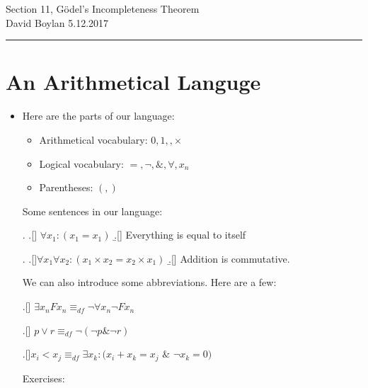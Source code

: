 \documentclass[justified]{tufte-handout}
\newcommand{\HRule}{\rule{\linewidth}{0.1mm}}
\begin{document}
\frenchspacing

\begin{fullwidth}
\noindent\LARGE Section 11, G\"{o}del's Incompleteness Theorem \normalsize \\[.3cm]
\noindent  David Boylan \hfill{5.12.2017}

\noindent\HRule
\end{fullwidth}

\section{An Arithmetical Languge}

\begin{itemize}

\item Here are the parts of our language:

\begin{itemize}
\item Arithmetical vocabulary: $0,1, ,\times$

\item Logical vocabulary: $=, \neg, \&, \forall, x_n$

\item Parentheses: $(,)$

\end{itemize}

\vspace{.4cm} 

Some sentences in our language:

\ex.  \a.[] $\forall x_1: (x_1=x_1)$
\b.[] Everything is equal to itself

\ex. \a.[]$\forall x_1\forall x_2:  (x_1 \times x_2 = x_2 \times x_1)$
\b.[] Addition is commutative.

\vspace{.4cm} 


We can also introduce some abbreviations. Here are a few: 

\ex.[] $\exists x_n Fx_n \equiv_{df} \neg\forall x_n\neg Fx_n $ 

\ex.[] $ p \vee r \equiv_{df} \neg(\neg p \& \neg r)$

\ex.[]$x_i < x_j \equiv_{df} \exists x_k:(x_i + x_k= x_j$ $\&$ $\neg x_k = 0 )$  


\vspace{.4cm} 


 Exercises:

\begin{itemize}



\end{itemize}
\end{itemize}
\end{document}
